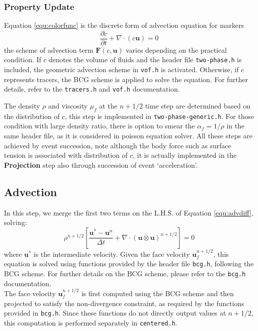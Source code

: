 \documentclass[a4paper]{article}
\begin{document}
\subsubsection{Property Update}
Equation \ref{equ:colorfunc} is the discrete form of advection equation for markers
\begin{equation}
    \frac{\partial c}{\partial t} + \nabla\cdot(c\mathbf{u}) = 0
\end{equation}
the scheme of advection term $\mathbf{F}(c,\mathbf{u})$ varies depending on the practical condition. If $c$ denotes the volume of fluids and the header file \texttt{two-phase.h} is included, the geometric advection scheme in \texttt{vof.h} is activated. Otherwise, if $c$ represents tracers, the BCG scheme is applied to solve the equation. For further details, refer to the \texttt{tracers.h} and \texttt{vof.h} documentation.

The density $\rho$ and viscosity $\mu_f$ at the $n+1/2$ time step are determined based on the distribution of $c$, this step is implemented in \texttt{two-phase-generic.h}. For those condition with large density ratio, there is option to smear the $\alpha_f=1/\rho$ in the same header file, as it is considered in poisson equation solver. All these steps are achieved by event succession, note although the body force such as surface tension is associated with distribution of $c$, it is actually implemented in the \textbf{Projection} step also through succession of event `acceleration'.
\subsection{Advection}

In this step, we merge the first two terms on the L.H.S. of Equation \ref{equ:advdiff}, solving:  
\begin{equation}
    \rho^{n+1/2}\left[\frac{\mathbf{u}^* - \mathbf{u}^n}{\Delta t} + \nabla\cdot(\mathbf{u}\otimes\mathbf{u})^{n+1/2}\right] = 0\label{equ:adv}
\end{equation}  
where $\mathbf{u}^*$ is the intermediate velocity. Given the face velocity $\mathbf{u}^{n+1/2}_f$, this equation is solved using functions provided by the header file \texttt{bcg.h}, following the BCG scheme.  For further details on the BCG scheme, please refer to the \texttt{bcg.h} documentation.\\
The face velocity $\mathbf{u}^{n+1/2}_f$ is first computed using the BCG scheme and then projected to satisfy the non-divergence constraint, as required by the functions provided in \texttt{bcg.h}. Since these functions do not directly output values at $n+1/2$, this computation is performed separately in \texttt{centered.h}.\\
\end{document}
